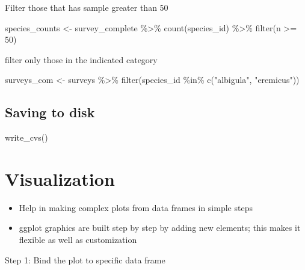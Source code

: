 \documentclass[
  letterpaper,
  DIV=11,
  numbers=noendperiod]{scrreprt}
\newenvironment{Shaded}{\begin{snugshade}}{\end{snugshade}}
\newcommand{\DecValTok}[1]{\textcolor[rgb]{0.68,0.00,0.00}{#1}}
\newcommand{\FunctionTok}[1]{\textcolor[rgb]{0.28,0.35,0.67}{#1}}
\newcommand{\NormalTok}[1]{\textcolor[rgb]{0.00,0.23,0.31}{#1}}
\newcommand{\OtherTok}[1]{\textcolor[rgb]{0.00,0.23,0.31}{#1}}
\newcommand{\SpecialCharTok}[1]{\textcolor[rgb]{0.37,0.37,0.37}{#1}}
\newcommand{\StringTok}[1]{\textcolor[rgb]{0.13,0.47,0.30}{#1}}
\providecommand{\tightlist}{%
  \setlength{\itemsep}{0pt}\setlength{\parskip}{0pt}}\usepackage{longtable,booktabs,array}
\begin{document}
Filter those that has sample greater than 50

\begin{Shaded}
\begin{Highlighting}[]
\NormalTok{species\_counts }\OtherTok{\textless{}{-}}\NormalTok{ survey\_complete }\SpecialCharTok{\%\textgreater{}\%}
  \FunctionTok{count}\NormalTok{(species\_id) }\SpecialCharTok{\%\textgreater{}\%}
  \FunctionTok{filter}\NormalTok{(n }\SpecialCharTok{\textgreater{}=} \DecValTok{50}\NormalTok{)}
\end{Highlighting}
\end{Shaded}

filter only those in the indicated category

\begin{Shaded}
\begin{Highlighting}[]
\NormalTok{surveys\_com }\OtherTok{\textless{}{-}}\NormalTok{ surveys }\SpecialCharTok{\%\textgreater{}\%}
    \FunctionTok{filter}\NormalTok{(species\_id }\SpecialCharTok{\%in\%} \FunctionTok{c}\NormalTok{(}\StringTok{"albigula"}\NormalTok{, }\StringTok{"eremicus"}\NormalTok{))}
\end{Highlighting}
\end{Shaded}

\subsection{Saving to disk}\label{saving-to-disk}

\begin{Shaded}
\begin{Highlighting}[]
\FunctionTok{write\_cvs}\NormalTok{()}
\end{Highlighting}
\end{Shaded}

\section{Visualization}\label{visualization}

\begin{itemize}
\tightlist
\item
  Help in making complex plots from data frames in simple steps
\item
  ggplot graphics are built step by step by adding new elements; this
  makes it flexible as well as customization
\end{itemize}

Step 1: Bind the plot to specific data frame
\end{document}
